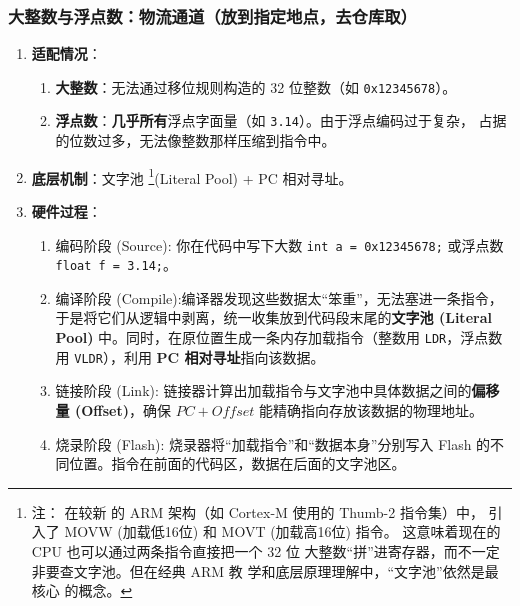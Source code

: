 \subsubsection{大整数与浮点数：物流通道（放到指定地点，去仓库取）}

\begin{enumerate}[label=(\arabic*), wide=0pt]
    \item \textbf{适配情况}：
    \begin{enumerate}[label=\ding{\numexpr171+\arabic*}]
        \item \textbf{大整数}：无法通过移位规则构造的 32 位整数（如 \texttt{0x12345678}）。
        \item \textbf{浮点数}：\textbf{几乎所有}浮点字面量（如 \texttt{3.14}）。由于浮点编码过于复杂，
        占据的位数过多，无法像整数那样压缩到指令中。
    \end{enumerate}





    \item \textbf{底层机制}：文字池 \footnote{注： 在较新
    的 ARM 架构（如 Cortex-M 使用的 Thumb-2 指令集）中，
    引入了 MOVW (加载低16位) 和 MOVT (加载高16位) 指令。
    这意味着现在的 CPU 也可以通过两条指令直接把一个 32 位
    大整数“拼”进寄存器，而不一定非要查文字池。但在经典 ARM 教
    学和底层原理理解中，“文字池”依然是最核心
    的概念。}(Literal Pool) + PC 相对寻址。



    \item \textbf{硬件过程}： 
    



 \begin{enumerate}[label=\ding{\numexpr171+\arabic*}]
    \item 编码阶段 (Source): 你在代码中写下大数 \texttt{int a = 0x12345678;} 或浮点数 \texttt{float f = 3.14;}。
    
    \item 编译阶段 (Compile):编译器发现这些数据太“笨重”，无法塞进一条指令，于是将它们从逻辑中剥离，统一收集放到代码段末尾的\textbf{文字池 (Literal Pool)} 中。同时，在原位置生成一条内存加载指令（整数用 \texttt{LDR}，浮点数用 \texttt{VLDR}），利用 \textbf{PC 相对寻址}指向该数据。
    
    \item 链接阶段 (Link): 链接器计算出加载指令与文字池中具体数据之间的\textbf{偏移量 (Offset)}，确保 $PC + Offset$ 能精确指向存放该数据的物理地址。
    
    \item 烧录阶段 (Flash): 烧录器将“加载指令”和“数据本身”分别写入 Flash 的不同位置。指令在前面的代码区，数据在后面的文字池区。
    

\end{enumerate}
\end{enumerate}
